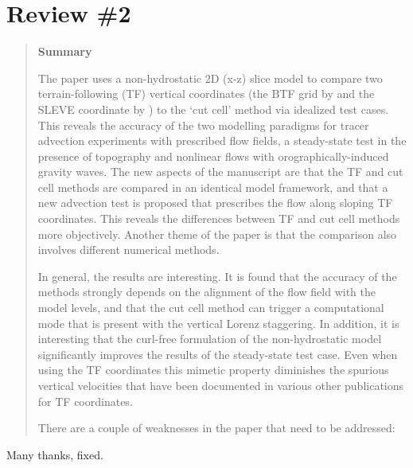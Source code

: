 \documentclass{article}
\begin{document}
\section*{Review \#2}
\begin{quotation}
\noindent
\textbf{Summary}

\noindent The paper uses a non-hydrostatic 2D (x-z) slice model to compare two terrain-following (TF) vertical coordinates (the BTF grid by \citet{galchen-somerville1975} and the SLEVE coordinate by \citet{schaer2002}) to the `cut cell' method via idealized test cases.
This reveals the accuracy of the two modelling paradigms for tracer advection experiments with prescribed flow fields, a steady-state test in the presence of topography and nonlinear flows with orographically-induced gravity waves.  The new aspects of the manuscript are that the TF and cut cell methods are compared in an identical model framework, and that a new advection test is proposed that prescribes the flow along sloping TF coordinates.  This reveals the differences between TF and cut cell methods more objectively.
Another theme of the paper is that the comparison also involves different numerical methods.

In general, the results are interesting.  It is found that the accuracy of the methods strongly depends on the alignment of the flow field with the model levels, and that the cut cell method can trigger a computational mode that is present with the vertical Lorenz staggering.
In addition, it is interesting that the curl-free formulation of the non-hydrostatic model significantly improves the results of the steady-state test case.
Even when using the TF coordinates this mimetic property diminishes the spurious vertical velocities that have been documented in various other publications for TF coordinates.


There are a couple of weaknesses in the paper that need to be addressed:
\begin{comment}
\item A sign error in the derivation of the new advection test case in section 4b.
	Maybe it is just a typo in the manuscript, but if this wrong formulation has indeed been used
	in the example results, they all need to be rerun and corrected (see the detailed information below).
\end{comment}
\end{quotation}
Many thanks, fixed.
\begin{quotation}
\begin{comment}
\item Inconsistent sign convention for the stream function and the derived velocities.  The sign is switched in sections 4a and 4b, which needs to be unified.
\end{comment}
\end{quotation}
\end{document}
